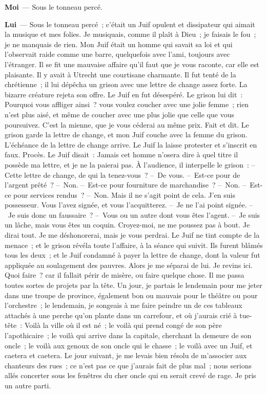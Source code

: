 \documentclass[french,twoside]{book} %
\newcommand{\labelchar}[1]{\textbf{\color{rubric} #1}}
\begin{document}
\labelchar{Moi} — Sous le tonneau percé.\par
\labelchar{Lui} — Sous le tonneau percé ; c’était un Juif opulent et dissipateur qui aimait la musique et mes folies. Je musiquais, comme il plaît à Dieu ; je faisais le fou ; je ne manquais de rien. Mon Juif était un homme qui savait sa loi et qui l’observait raide comme une barre, quelquefois avec l’ami, toujours avec l’étranger. Il se fit une mauvaise affaire qu’il faut que je vous raconte, car elle est plaisante. Il y avait à Utrecht une courtisane charmante. Il fut tenté de la chrétienne ; il lui dépêcha un grison avec une lettre de change assez forte. La bizarre créature rejeta son offre. Le Juif en fut désespéré. Le grison lui dit : Pourquoi vous affliger ainsi ? vous voulez coucher avec une jolie femme ; rien n’est plus aisé, et même de coucher avec une plus jolie que celle que vous poursuivez. C’est la mienne, que je vous céderai au même prix. Fait et dit. Le grison garde la lettre de change, et mon Juif couche avec la femme du grison. L’échéance de la lettre de change arrive. Le Juif la laisse protester et s’inscrit en faux. Procès. Le Juif disait : Jamais cet homme n’osera dire à quel titre il possède ma lettre, et je ne la paierai pas. À l’audience, il interpelle le grison : – Cette lettre de change, de qui la tenez-vous ? – De vous. – Est-ce pour de l’argent prêté ? – Non. – Est-ce pour fourniture de marchandise ? – Non. – Est-ce pour services rendus ? – Non. Mais il ne s’agit point de cela. J’en suis possesseur. Vous l’avez signée, et vous l’acquitterez. – Je ne l’ai point signée. – Je suis donc un faussaire ? – Vous ou un autre dont vous êtes l’agent. – Je suis un lâche, mais vous êtes un coquin. Croyez-moi, ne me poussez pas à bout. Je dirai tout. Je me déshonorerai, mais je vous perdrai. Le Juif ne tint compte de la menace ; et le grison révéla toute l’affaire, à la séance qui suivit. Ils furent blâmés tous les deux ; et le Juif condamné à payer la lettre de change, dont la valeur fut appliquée au soulagement des pauvres. Alors je me séparai de lui. Je revins ici. Quoi faire ? car il fallait périr de misère, ou faire quelque chose. Il me passa toutes sortes de projets par la tête. Un jour, je partais le lendemain pour me jeter dans une troupe de province, également bon ou mauvais pour le théâtre ou pour l’orchestre ; le lendemain, je songeais à me faire peindre un de ces tableaux attachés à une perche qu’on plante dans un carrefour, et où j’aurais crié à tue-tête : Voilà la ville où il est né ; le voilà qui prend congé de son père l’apothicaire ; le voilà qui arrive dans la capitale, cherchant la demeure de son oncle ; le voilà aux genoux de son oncle qui le chasse ; le voilà avec un Juif, et caetera et caetera. Le jour suivant, je me levais bien résolu de m’associer aux chanteurs des rues ; ce n’est pas ce que j’aurais fait de plus mal ; nous serions allés concerter sous les fenêtres du cher oncle qui en serait crevé de rage. Je pris un autre parti.\par
\end{document}
